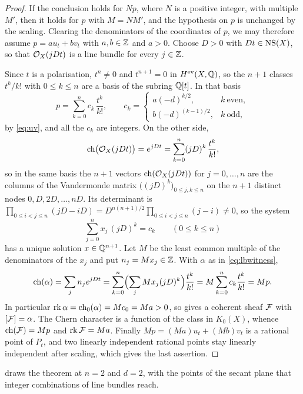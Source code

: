 \begin{proof}
If the conclusion holds for $Np$, where $N$ is a positive integer, with
multiple $M'$, then it holds for $p$ with $M=NM'$, and the hypothesis on $p$
is unchanged by the scaling. Clearing the denominators of the coordinates of
$p$, we may therefore assume $p=au_{t}+bv_{t}$ with $a,b\in\mathbb{Z}$ and $a>0$.
Choose $D>0$ with $Dt\in\mathrm{NS}(X)$, so that $\mathcal{O}_{X}(jDt)$ is a line bundle for
every $j\in\mathbb{Z}$.

Since $t$ is a polarisation, $t^{n}\ne0$ and $t^{n+1}=0$ in
$H^{\mathrm{ev}}(X,\mathbb{Q})$, so the $n+1$ classes $t^{k}/k!$ with $0\le k\le n$
are a basis of the subring $\mathbb{Q}[t]$. In that basis
\[
  p=\sum_{k=0}^{n}c_{k}\,\frac{t^{k}}{k!},\qquad
  c_{k}=\begin{cases}a(-d)^{k/2}, & k\ \text{even},\\[2pt]
                     b(-d)^{(k-1)/2}, & k\ \text{odd},\end{cases}
\]
by \eqref{eq:uv}, and all the $c_{k}$ are integers. On the other
side,
\[
  \operatorname{ch}\bigl(\mathcal{O}_{X}(jDt)\bigr)=e^{jDt}=\sum_{k=0}^{n}(jD)^{k}\,\frac{t^{k}}{k!},
\]
so in the same basis the $n+1$ vectors $\operatorname{ch}(\mathcal{O}_{X}(jDt))$ for $j=0,\dots,n$
are the columns of the Vandermonde matrix $\bigl((jD)^{k}\bigr)_{0\le j,k\le n}$
on the $n+1$ distinct nodes $0,D,2D,\dots,nD$. Its determinant is
$\prod_{0\le i<j\le n}(jD-iD)=D^{n(n+1)/2}\prod_{0\le i<j\le n}(j-i)\ne0$, so
the system
\[
  \sum_{j=0}^{n}x_{j}\,(jD)^{k}=c_{k}\qquad(0\le k\le n)
\]
has a unique solution $x\in\mathbb{Q}^{n+1}$. Let $M$ be the least common multiple of
the denominators of the $x_{j}$ and put $n_{j}=Mx_{j}\in\mathbb{Z}$. With $\alpha$ as
in \eqref{eq:lbwitness},
\[
  \operatorname{ch}(\alpha)=\sum_{j}n_{j}e^{jDt}
  =\sum_{k=0}^{n}\Bigl(\sum_{j}Mx_{j}(jD)^{k}\Bigr)\frac{t^{k}}{k!}
  =M\sum_{k=0}^{n}c_{k}\frac{t^{k}}{k!}=Mp .
\]
In particular $\operatorname{rk}\alpha=\operatorname{ch}_{0}(\alpha)=Mc_{0}=Ma>0$, so 
gives a coherent sheaf $\mathcal{F}$ with $[\mathcal{F}]=\alpha$. The Chern character is a
function of the class in $K_{0}(X)$, whence $\operatorname{ch}(\mathcal{F})=Mp$ and $\operatorname{rk}\mathcal{F}=Ma$.
Finally $Mp=(Ma)u_{t}+(Mb)v_{t}$ is a rational point of $P_{t}$, and two
linearly independent rational points stay linearly independent after scaling,
which gives the last assertion.
\end{proof}

 draws the theorem at $n=2$ and $d=2$, with the points of
the secant plane that integer combinations of line bundles reach.

